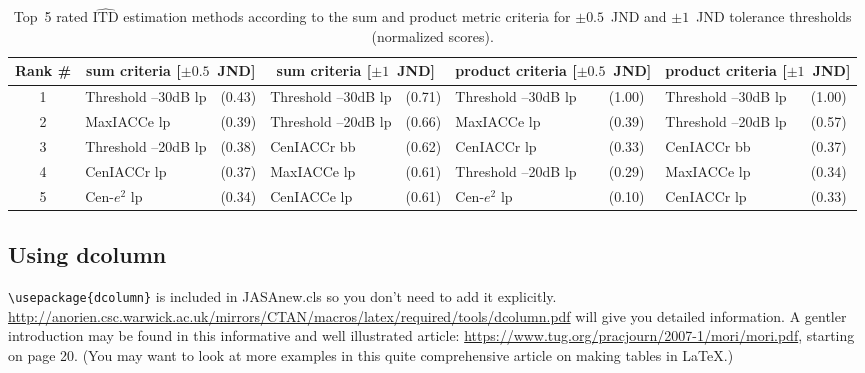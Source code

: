\documentclass[reprint,NumberedRefs]{JASAnew}
\begin{document}
\begin{table}[b]
\caption{Top~5 rated $\widehat{\textrm{ITD}}$ estimation methods
according to the sum and product metric criteria for $\pm0.5$~JND and
$\pm1$~JND tolerance thresholds (normalized scores).}

\begin{adjustbox}{width=\textwidth}
\begin{tabular}{c| l l| l l| l l| l l}
\hline\hline
Rank \#& \multicolumn{2}{c}{sum criteria [$\pm0.5$~JND]} &
\multicolumn{2}{|c}{sum criteria [$\pm1$~JND]} &
\multicolumn{2}{|c}{product criteria [$\pm0.5$~JND]} & \multicolumn{2}{|c}{product criteria [$\pm1$~JND]}\\ 
\hline
1 & Threshold --30dB {lp} & (0.43) & Threshold --30dB {lp} & (0.71) & Threshold --30dB {lp} & (1.00) & Threshold --30dB {lp} & (1.00) \\ 
2 & MaxIACCe {lp} & (0.39) & Threshold --20dB {lp} & (0.66) & MaxIACCe {lp} & (0.39) & Threshold --20dB {lp} & (0.57) \\ 
3 & Threshold --20dB {lp} & (0.38) & CenIACCr {bb} &(0.62) & CenIACCr {lp} &(0.33) & CenIACCr {bb} & (0.37) \\ 
4 & CenIACCr {lp} &(0.37) & MaxIACCe {lp} & (0.61) & Threshold --20dB {lp} & (0.29) & MaxIACCe {lp} & (0.34) \\ 
5 & Cen-$e^2$ {lp} &(0.34) & CenIACCe {lp} & (0.61) & Cen-$e^2$ {lp}
& (0.10) & CenIACCr {lp} & (0.33) \\
\hline\hline
\end{tabular}
\end{adjustbox}

\label{tab:topMethods} 
\end{table}



\clearpage


\subsection{Using dcolumn}
\verb+\usepackage{dcolumn}+ is included in JASAnew.cls so you
don't need to add it explicitly.
\href{http://anorien.csc.warwick.ac.uk/mirrors/CTAN/macros/latex/required/tools/dcolumn.pdf}
{\url{http://anorien.csc.warwick.ac.uk/mirrors/CTAN/macros/latex/required/tools/dcolumn.pdf}}
will give you detailed information.
A gentler introduction may be found in this informative and well
illustrated
article: \href{https://www.tug.org/pracjourn/2007-1/mori/mori.pdf}
{\url{https://www.tug.org/pracjourn/2007-1/mori/mori.pdf}}, starting on page
20. (You may want to look at more examples in this quite comprehensive
article on making tables in \LaTeX.)
\end{document}
